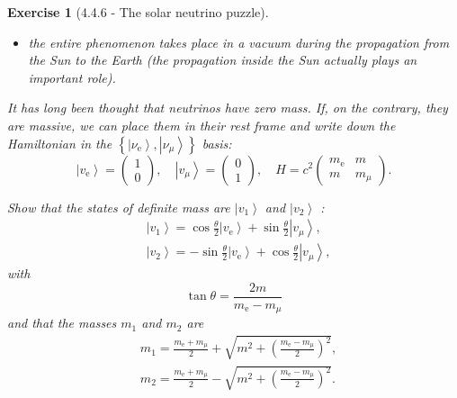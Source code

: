 \documentclass[12pt]{article}
\def\bea{\begin{eqnarray*}}
\newtheorem{exercise}{Exercise}
\begin{document}
\begin{exercise}[4.4.6 - The solar neutrino puzzle]
\begin{itemize}
			\item the entire phenomenon takes place in a vacuum during the propagation from the Sun to the Earth (the propagation inside the Sun actually plays an important role).
		\end{itemize}
		It has long been thought that neutrinos have zero mass. If, on the contrary, they are massive, we can place them in their rest frame and write down the Hamiltonian in the $\left\{\left|\nu_{\mathrm{e}}\right\rangle,\left|\nu_{\mu}\right\rangle\right\}$ basis:
		$$
		\left|v_{\mathrm{e}}\right\rangle=\left(\begin{array}{l}
			1 \\
			0
		\end{array}\right), \quad\left|v_{\mu}\right\rangle=\left(\begin{array}{l}
			0 \\
			1
		\end{array}\right), \quad H=c^{2}\left(\begin{array}{cc}
			m_{\mathrm{e}} & m \\
			m & m_{\mu}
		\end{array}\right) .
		$$
		\begin{exercises}
			\item Show that the states of definite mass are $\left|v_{1}\right\rangle$ and $\left|v_{2}\right\rangle$ :
			$$
			\begin{aligned}
				& \left|v_{1}\right\rangle=\cos \frac{\theta}{2}\left|v_{\mathrm{e}}\right\rangle+\sin \frac{\theta}{2}\left|v_{\mu}\right\rangle, \\
				& \left|v_{2}\right\rangle=-\sin \frac{\theta}{2}\left|v_{\mathrm{e}}\right\rangle+\cos \frac{\theta}{2}\left|v_{\mu}\right\rangle,
			\end{aligned}
			$$
			with
			$$
			\tan \theta=\frac{2 m}{m_{\mathrm{e}}-m_{\mu}}
			$$
			and that the masses $m_{1}$ and $m_{2}$ are
			$$
			\begin{aligned}
				& m_{1}=\frac{m_{\mathrm{e}}+m_{\mu}}{2}+\sqrt{m^{2}+\left(\frac{m_{\mathrm{e}}-m_{\mu}}{2}\right)^{2}}, \\
				& m_{2}=\frac{m_{\mathrm{e}}+m_{\mu}}{2}-\sqrt{m^{2}+\left(\frac{m_{\mathrm{e}}-m_{\mu}}{2}\right)^{2}} .
			\end{aligned}
			$$
\end{exercises}
\end{exercise}
\end{document}

